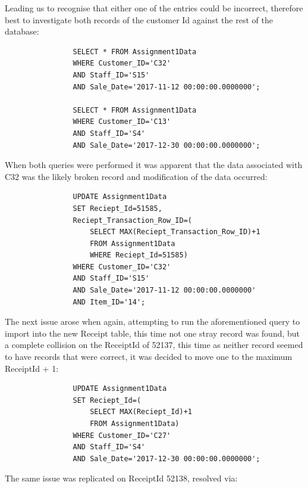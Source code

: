 \documentclass{article}
\begin{document}
            Leading us to recognise that either one of the entries could be incorrect, therefore
            best to investigate both records of the customer Id against the rest of the database:

            \begin{lstlisting}
                SELECT * FROM Assignment1Data 
                WHERE Customer_ID='C32' 
                AND Staff_ID='S15' 
                AND Sale_Date='2017-11-12 00:00:00.0000000';
            
                SELECT * FROM Assignment1Data 
                WHERE Customer_ID='C13' 
                AND Staff_ID='S4' 
                AND Sale_Date='2017-12-30 00:00:00.0000000';
            \end{lstlisting}

            When both queries were performed it was apparent that the data associated with C32 was 
            the likely broken record and modification of the data occurred:

            \begin{lstlisting}
                UPDATE Assignment1Data 
                SET Reciept_Id=51585, 
                Reciept_Transaction_Row_ID=(
                    SELECT MAX(Reciept_Transaction_Row_ID)+1 
                    FROM Assignment1Data
                    WHERE Reciept_Id=51585)
                WHERE Customer_ID='C32' 
                AND Staff_ID='S15' 
                AND Sale_Date='2017-11-12 00:00:00.0000000' 
                AND Item_ID='14';
            \end{lstlisting}

            The next issue arose when again, attempting to run the aforementioned query to import
            into the new Receipt table, this time not one stray record was found, but a complete
            collision on the ReceiptId of 52137, this time as neither record seemed to have 
            records that were correct, it was decided to move one to the maximum ReceiptId + 1:

            \begin{lstlisting}
                UPDATE Assignment1Data 
                SET Reciept_Id=(
                    SELECT MAX(Reciept_Id)+1 
                    FROM Assignment1Data) 
                WHERE Customer_ID='C27' 
                AND Staff_ID='S4' 
                AND Sale_Date='2017-12-30 00:00:00.0000000';
            \end{lstlisting}

            The same issue was replicated on ReceiptId 52138, resolved via:
\end{document}

